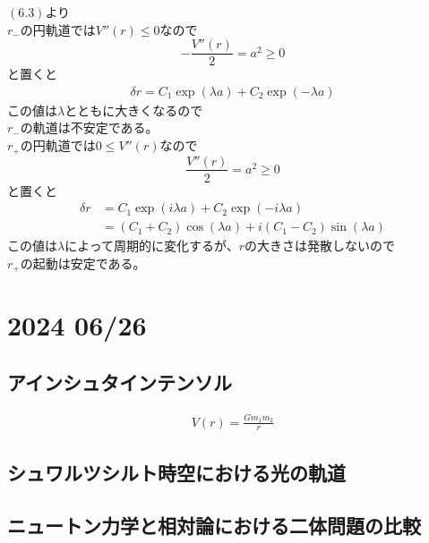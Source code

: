 \documentclass[dvipdfmx]{report} %
\begin{document}
$(6.3)$より\\
$r_{-}$の円軌道では$V''(r) \leq 0$なので\\
\[
	-\frac{V''(r)}{2} = a^2 \geq 0
\]
と置くと
\begin{equation*}
\begin{split}
	\delta r = C_1 \exp \left( \lambda a \right) + C_2 \exp \left( - \lambda a \right)
\end{split}
\end{equation*}
この値は$\lambda$とともに大きくなるので\\
$r_{-}$の軌道は不安定である。\\
$r_{+}$の円軌道では$0 \leq V''(r)$なので\\
\[
	\frac{V''(r)}{2} = a^2 \geq 0
\]
と置くと
\begin{equation*}
\begin{split}
	\delta r &= C_1 \exp \left( i \lambda a \right) + C_2 \exp \left( - i \lambda a \right)\\
	&= (C_1 + C_2)\cos (\lambda a) + i (C_1 - C_2)\sin (\lambda a)
\end{split}
\end{equation*}
この値は$\lambda$によって周期的に変化するが、$r$の大きさは発散しないので\\
$r_{+}$の起動は安定である。\\
\chapter{2024 06/26}
\section{
	アインシュタインテンソル
}

\begin{equation*}
\begin{split}
	V(r) = \frac{Gm_1m_2}{r}
\end{split}
\end{equation*}

\section{
	シュワルツシルト時空における光の軌道
}

\section{
	ニュートン力学と相対論における二体問題の比較
}
\end{document}
